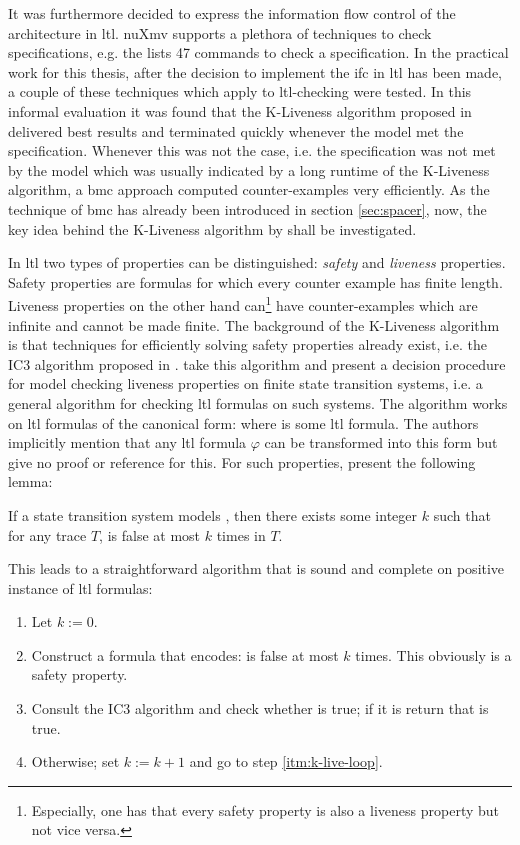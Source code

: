 It was furthermore decided to express the information flow control of the architecture in \gls{ltl}.
nuXmv supports a plethora of techniques to check specifications, e.g. the  \cite{nuXmv} lists 47 commands to check a specification.
In the practical work for this thesis, after the decision to implement the \gls{ifc} in \gls{ltl} has been made, a couple of these techniques which apply to \gls{ltl}-checking were tested.
In this informal evaluation it was found that the K-Liveness algorithm proposed in \cite{Claessen12} delivered best results and terminated quickly whenever the model met the specification.
Whenever this was not the case, i.e. the specification was not met by the model which was usually indicated by a long runtime of the K-Liveness algorithm, a \gls{bmc} approach computed counter-examples very efficiently.
As the technique of \gls{bmc} has already been introduced in section \ref{sec:spacer}, now, the key idea behind the K-Liveness algorithm by \citeauthor{Claessen12} shall be investigated.

In \gls{ltl} two types of properties can be distinguished: \textit{safety} and \textit{liveness} properties.
Safety properties are formulas for which every counter example has finite length.
Liveness properties on the other hand can\footnote{%
    Especially, one has that every safety property is also a liveness property but not vice versa.
} have counter-examples which are infinite and cannot be made finite.
The background of the K-Liveness algorithm is that techniques for efficiently solving safety properties already exist, i.e. the IC3 algorithm proposed in \cite{Bradley11}.
\citeauthor{Claessen12} take this algorithm and present a decision procedure for model checking liveness properties on finite state transition systems, i.e. a general algorithm for checking \gls{ltl} formulas on such systems.
The algorithm works on \gls{ltl} formulas of the canonical form:  where  is some \gls{ltl} formula.
The authors implicitly mention that any \gls{ltl} formula $ \varphi $ can be transformed into this form but give no proof or reference for this.
For such properties, \citeauthor{Claessen12} present the following lemma:
\begin{lemma}
    If a state transition system models , then there exists some integer $ k $ such that for any trace $ T $,  is false at most $ k $ times in $ T $.
\end{lemma}
This leads to a straightforward algorithm that is sound and complete on positive instance of \gls{ltl} formulas:
\begin{enumerate}
    \item Let $ k := 0 $.
    \item Construct a formula  that encodes:  is false at most $ k $ times. \label{itm:k-live-loop}
    This obviously is a safety property.
    \item Consult the IC3 algorithm and check whether  is true; if it is return that  is true.
    \item Otherwise; set $ k := k + 1 $ and go to step \ref{itm:k-live-loop}.
\end{enumerate}


